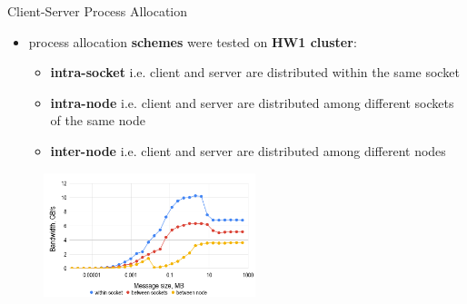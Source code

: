 \begin{frame}[t]{Client-Server Process Allocation}
    \small
    \justifying
    
    \begin{itemize}
        \item {} process allocation \textbf{schemes} were tested on \textbf{HW1 cluster}:
        \begin{itemize}
            \item \textbf{intra-socket} i.e. client and server are distributed within the same socket
            \item \textbf{intra-node} i.e. client and server are distributed among different sockets of the same node
            \item \textbf{inter-node} i.e. client and server are distributed among different nodes
        \end{itemize}
    \end{itemize}

    \begin{figure}[t]
        \centering
        \includegraphics[width=0.55\textwidth]{figures/chapter-3/hw1-bandwidth.png}
    \end{figure}

\end{frame}
\fi